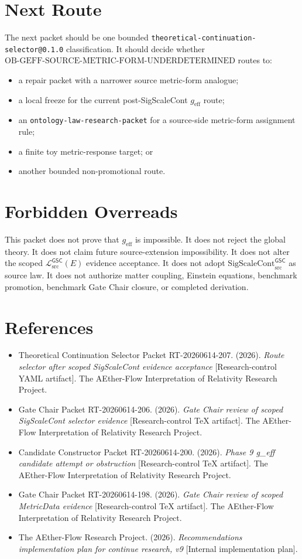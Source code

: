 \documentclass[11pt]{article}
\newcommand{\MetricData}{\mathcal{L}_{\mathrm{src}}^{\mathsf{GSC}}}
\newcommand{\geff}{g_{\mathrm{eff}}}
\newcommand{\SigScaleCont}{\mathrm{SigScaleCont}_{\mathrm{src}}^{\mathsf{GSC}}}
\newcommand{\ObMetricForm}{\mathrm{OB\mbox{-}GEFF\mbox{-}SOURCE\mbox{-}METRIC\mbox{-}FORM\mbox{-}UNDERDETERMINED}}
\begin{document}
\section{Next Route}

The next packet should be one bounded
\texttt{theoretical-continuation-selector@0.1.0} classification. It should
decide whether \(\ObMetricForm\) routes to:
\begin{itemize}[leftmargin=*]
  \item a repair packet with a narrower source metric-form analogue;
  \item a local freeze for the current post-SigScaleCont \(\geff\) route;
  \item an \texttt{ontology-law-research-packet} for a source-side
  metric-form assignment rule;
  \item a finite toy metric-response target; or
  \item another bounded non-promotional route.
\end{itemize}

\section{Forbidden Overreads}

This packet does not prove that \(\geff\) is impossible. It does not reject the
global theory. It does not claim future source-extension impossibility. It does
not alter the scoped \(\MetricData(E)\) evidence acceptance. It does not adopt
\(\SigScaleCont\) as source law. It does not authorize matter coupling,
Einstein equations, benchmark promotion, benchmark Gate Chair closure, or
completed derivation.

\section{References}

\begin{itemize}[leftmargin=*]
  \item Theoretical Continuation Selector Packet RT-20260614-207. (2026).
  \emph{Route selector after scoped SigScaleCont evidence acceptance}
  [Research-control YAML artifact]. The AEther-Flow Interpretation of
  Relativity Research Project.
  \item Gate Chair Packet RT-20260614-206. (2026). \emph{Gate Chair review of
  scoped SigScaleCont selector evidence} [Research-control TeX artifact]. The
  AEther-Flow Interpretation of Relativity Research Project.
  \item Candidate Constructor Packet RT-20260614-200. (2026). \emph{Phase 9
  g\_eff candidate attempt or obstruction} [Research-control TeX artifact].
  The AEther-Flow Interpretation of Relativity Research Project.
  \item Gate Chair Packet RT-20260614-198. (2026). \emph{Gate Chair review of
  scoped MetricData evidence} [Research-control TeX artifact]. The AEther-Flow
  Interpretation of Relativity Research Project.
  \item The AEther-Flow Research Project. (2026). \emph{Recommendations
  implementation plan for continue research, v9} [Internal implementation
  plan].
\end{itemize}
\end{document}
